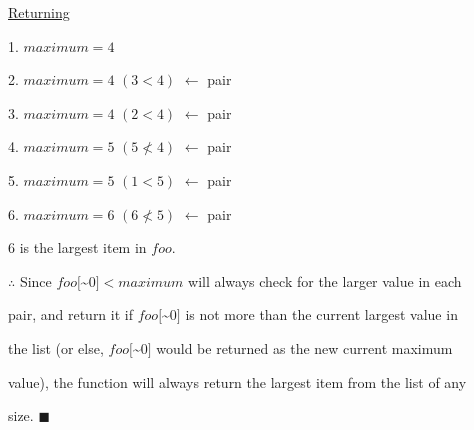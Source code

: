 \documentclass{article}
\begin{document}
\underline{Returning}


1. $maximum = 4$

2. $maximum = 4$ $(3 < 4)$ $\leftarrow$ pair

3. $maximum = 4$ $(2 < 4)$ $\leftarrow$ pair

4. $maximum = 5$ $(5 \not < 4)$ $\leftarrow$ pair

5. $maximum = 5$ $(1 < 5)$ $\leftarrow$ pair

6. $maximum = 6$ $(6 \not < 5)$  $\leftarrow$ pair

\vspace{0.5cm}

6 is the largest item in $foo$.

\vspace{0.2cm}

$\therefore$ Since $foo[$\textasciitilde{}$0] < maximum$ will always check for the larger value in each 

pair, and return it if $foo[$\textasciitilde{}$0]$ is not more than the current largest value in 

the list (or else, $foo[$\textasciitilde{}$0]$ would be returned as the new current maximum 

value), the function will always return the largest item from the list of any 

size. \hspace{0.5cm} $\blacksquare$
\end{document}

